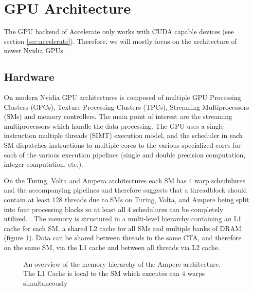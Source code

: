 \section{GPU Architecture}
The GPU backend of Accelerate only works with CUDA capable devices (see section \ref{sec:accelerate}).
Therefore, we will mostly focus on the architecture of newer Nvidia GPUs.

\subsection{Hardware}
On modern Nvidia GPU architectures is composed of multiple GPU Processing Clusters (GPCs), Texture Processing Clusters (TPCs), Streaming Multiprocessors (SMs) and memory controllers.
The main point of interest are the streaming multiprocessors which handle the data processing.
The GPU uses a single instruction multiple threads (SIMT) execution model, and the scheduler in each SM dispatches instructions to multiple cores to the various specialized cores for each of the various execution pipelines (single and double precision computation, integer computation, etc.).

On the Turing, Volta and Ampera architectures each SM has 4 warp schedulures and the accompanying pipelines and therefore \citeauthor{jia2019dissecting} suggests that a threadblock should contain at least 128 threads due to SMs on Turing, Volta, and Ampere being split into four processing blocks so at least all 4 schedulures can be completely utilized. \cite{jia2019dissecting,nvidia2017volta,nvidia2018turing,nvidia2020ampere}.
The memory is structured in a multi-level hierarchy containing an L1 cache for each SM, a shared L2 cache for all SMs and multiple banks of DRAM \cite{nvidia2017volta,nvidia2020ampere} (figure \ref{fig:ampere_architecture}).
Data can be shared between threads in the same CTA, and therefore on the same SM, via the L1 cache and between all threads via L2 cache.

\begin{figure}[!hb]
    \centering
    \caption{
        An overview of the memory hierarchy of the Ampere architecture. The L1 Cache is local to the SM which executes can 4 warps simultaneously 
    }
    \label{fig:ampere_architecture}
\end{figure}

